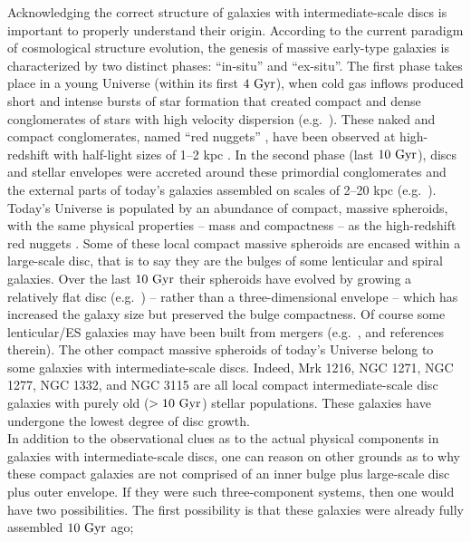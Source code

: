 \documentclass[useAMS,usenatbib,article]{mnras}
\begin{document}
Acknowledging the correct structure of galaxies with intermediate-scale discs is important to properly understand their origin. 
According to the current paradigm of cosmological structure evolution, 
the genesis of massive early-type galaxies is characterized by two distinct phases: ``in-situ'' and ``ex-situ''. 
The first phase takes place in a young Universe (within its first $4~\rm Gyr$), 
when cold gas inflows produced short and intense bursts of star formation 
that created compact and dense conglomerates of stars with high velocity dispersion (e.g.~\citealt{prieto2013}). 
These naked and compact conglomerates, named ``red nuggets'' \citep{damjanov2009}, 
have been observed at high-redshift with half-light sizes of 1--2 kpc \citep{daddi2005,trujillo2006,vandokkum2008}.
In the second phase (last $10~\rm Gyr$), discs and stellar envelopes 
were accreted around these primordial conglomerates and the external parts of today's galaxies assembled on scales of 2--20 kpc 
(e.g.~\citealt{driver2013}). \\
Today's Universe is populated by an abundance of compact, massive spheroids, 
with the same physical properties -- mass and compactness -- as the high-redshift red nuggets \citep{GDS2015}. 
Some of these local compact massive spheroids are encased within a large-scale disc, 
that is to say they are the bulges of some lenticular and spiral galaxies.  
Over the last $10~\rm Gyr$ their spheroids have evolved by growing a relatively flat disc (e.g.~\citealt{pichon2011,danovich2012,stewart2013})
-- rather than a three-dimensional envelope -- 
which has increased the galaxy size but preserved the bulge compactness. 
Of course some lenticular/ES galaxies may have been built from mergers (e.g.~\citealt{querejeta2015}, and references therein). 
The other compact massive spheroids of today's Universe belong to some galaxies with intermediate-scale discs. 
Indeed, Mrk 1216, NGC 1271, NGC 1277, NGC 1332, and NGC 3115 are all local compact intermediate-scale disc galaxies 
with purely old ($>10~\rm Gyr$) stellar populations. 
These galaxies have undergone the lowest degree of disc growth. \\
In addition to the observational clues as to the actual physical components in galaxies with intermediate-scale discs, 
one can reason on other grounds as to why these compact galaxies are not comprised of an inner bulge 
plus large-scale disc plus outer envelope. 
If they were such three-component systems, then one would have two possibilities. 
The first possibility is that these galaxies were already fully assembled $10~\rm Gyr$ ago; 
\end{document}
